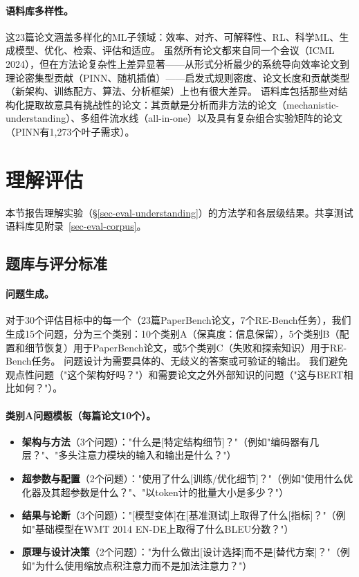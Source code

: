 \paragraph{语料库多样性。}
这23篇论文涵盖多样化的ML子领域：效率、对齐、可解释性、RL、科学ML、生成模型、优化、检索、评估和适应。
虽然所有论文都来自同一个会议（ICML 2024），但在方法论复杂性上差异显著——从形式分析最少的系统导向效率论文到理论密集型贡献（PINN、随机插值）——启发式规则密度、论文长度和贡献类型（新架构、训练配方、算法、分析框架）上也有很大差异。
语料库包括那些对结构化提取故意具有挑战性的论文：其贡献是分析而非方法的论文（mechanistic-understanding）、多组件流水线（all-in-one）以及具有复杂组合实验矩阵的论文（PINN有1{,}273个叶子需求）。


\section{理解评估}
\label{sec-understanding-eval}

本节报告理解实验（\S\ref{sec-eval-understanding}）的方法学和各层级结果。共享测试语料库见附录~\ref{sec-eval-corpus}。

\subsection{题库与评分标准}
\label{sec-question-bank}

\paragraph{问题生成。}
对于30个评估目标中的每一个（23篇PaperBench论文，7个RE-Bench任务），我们生成15个问题，分为三个类别：10个类别A（保真度：信息保留），5个类别B（配置和细节恢复）用于PaperBench论文，或5个类别C（失败和探索知识）用于RE-Bench任务。
问题设计为需要具体的、无歧义的答案或可验证的输出。
我们避免观点性问题（"这个架构好吗？"）和需要论文之外外部知识的问题（"这与BERT相比如何？"）。

\paragraph{类别A问题模板（每篇论文10个）。}
\begin{itemize}[leftmargin=*, itemsep=2pt]
    \item \textbf{架构与方法}（3个问题）："什么是[特定结构细节]？"（例如"编码器有几层？"、"多头注意力模块的输入和输出是什么？"）
    \item \textbf{超参数与配置}（2个问题）："使用了什么[训练/优化细节]？"（例如"使用什么优化器及其超参数是什么？"、"以token计的批量大小是多少？"）
    \item \textbf{结果与论断}（3个问题）："[模型变体]在[基准测试]上取得了什么[指标]？"（例如"基础模型在WMT 2014 EN-DE上取得了什么BLEU分数？"）
    \item \textbf{原理与设计决策}（2个问题）："为什么做出[设计选择]而不是[替代方案]？"（例如"为什么使用缩放点积注意力而不是加法注意力？"）
\end{itemize}

